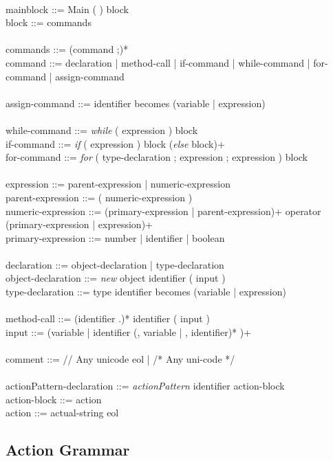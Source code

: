 {\\
mainblock ::= Main ( ) block \\
block ::= { commands } \\
\\
commands ::= (command ;)* \\
command ::= declaration | method-call | if-command | while-command | for-command | assign-command \\
\\
assign-command ::= identifier becomes  (variable | expression) \\
\\
while-command ::= \textit{while} ( expression ) block \\
if-command ::= \textit{if} ( expression ) block (\textit{else} block)+ \\
for-command ::= \textit{for} ( type-declaration ; expression ; expression ) block \\
\\
expression ::= parent-expression | numeric-expression \\
parent-expression ::= ( numeric-expression ) \\
numeric-expression ::= (primary-expression | parent-expression)+ operator (primary-expression | expression)+ \\
primary-expression ::= number | identifier | boolean \\
\\
declaration ::= object-declaration | type-declaration \\
object-declaration ::= \textit{new} object identifier ( input ) \\
type-declaration ::= type identifier becomes (variable | expression) \\
\\
method-call ::= (identifier .)* identifier ( input ) \\
input ::= (variable | identifier (, variable | , identifier)* )+ \\
\\
comment ::= // Any unicode eol | /* Any uni-code */ \\
\\
actionPattern-declaration ::= \textit{actionPattern} identifier action-block \\
action-block ::= { action } \\
action ::= actual-string eol


\subsection{Action Grammar}
\label{actiongrammar}

}
